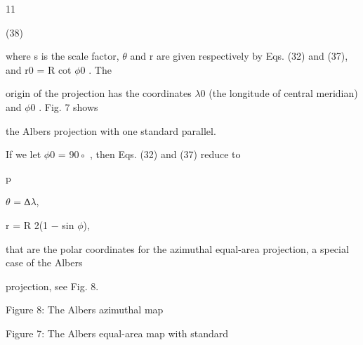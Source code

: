 \documentclass[a4paper,portrait,12pt]{article}
\begin{document}
11





(38)





\begin{flushleft}
\newpage
where s is the scale factor, $\theta$ and r are given respectively by Eqs. (32) and (37), and r0 = R cot $\phi$0 . The
\end{flushleft}


\begin{flushleft}
origin of the projection has the coordinates $\lambda$0 (the longitude of central meridian) and $\phi$0 . Fig. 7 shows
\end{flushleft}


\begin{flushleft}
the Albers projection with one standard parallel.
\end{flushleft}


\begin{flushleft}
If we let $\phi$0 = 90◦ , then Eqs. (32) and (37) reduce to
\end{flushleft}


\begin{flushleft}
p
\end{flushleft}


\begin{flushleft}
$\theta$ = ∆$\lambda$,
\end{flushleft}


\begin{flushleft}
r = R 2(1 $-$ sin $\phi$),
\end{flushleft}


\begin{flushleft}
that are the polar coordinates for the azimuthal equal-area projection, a special case of the Albers
\end{flushleft}


\begin{flushleft}
projection, see Fig. 8.
\end{flushleft}





\begin{flushleft}
Figure 8: The Albers azimuthal map
\end{flushleft}


\begin{flushleft}
Figure 7: The Albers equal-area map with standard
\end{flushleft}
\end{document}

